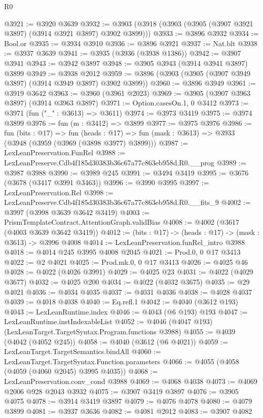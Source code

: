 \begin{lexlean}{R0}
\begin{coremodule}
@3921 := @3920 @3639
@3932 := @3903 (@3918 (@3903 (@3905 (@3907 @3921 @3897) (@3914 @3921 @3897) @3902 @3899)))
@3933 := @3896 @3932
@3934 := Bool.or
@3935 := @3934 @3910
@3936 := @3896 @3921
@3937 := Nat.blt
@3938 := @3937 @3639
@3941 := @3935 (@3936 (@3938 @1386))
@3942 := @3907 @3941
@3943 := @3942 @3897
@3948 := @3905 @3943 (@3914 @3941 @3897) @3899
@3949 := @3938 @2012
@3959 := @3896 (@3903 (@3905 (@3907 @3949 @3897) (@3914 @3949 @3897) @3902 @3899))
@3960 := @3896 @3949
@3961 := @3919 @3642
@3963 := @3960 (@3961 @2023)
@3969 := @3905 (@3907 @3963 @3897) (@3914 @3963 @3897)
@3971 := Option.casesOn.{1, 0} @3412
@3973 := @3971 (fun ("_" : @3613) => @3611)
@3974 := @3973 @3419
@3975 := @3974 @3899
@3976 := fun (m : @3412) => @3899
@3977 := @3975 @3976
@3986 := fun (bits : @17) =>
  fun (heads : @17) => fun (mask : @3613) => @3933 (@3948 (@3959 (@3969 (@3898 @3977) @3899)))
@3987 := LexLeanPreservation.FunRel
@3988 := LexLeanPreserve.Cdb4f185d30383b36c67a77c863eb958d.R0.__prog
@3989 := @3987 @3988
@3990 := @3989 @245
@3991 := @3494 @3419
@3995 := @3676 (@3678 (@3417 @3991 @3463))
@3996 := @3990 @3995
@3997 := LexLeanPreservation.Rel
@3998 := LexLeanPreserve.Cdb4f185d30383b36c67a77c863eb958d.R0.__fits_9
@4002 := @3997 (@3998 @3639 @3642 @3419)
@4003 := PrismTemplateContract.AttentionGraph.validBias
@4008 := @4002 (@3617 (@4003 @3639 @3642 @3419))
@4012 := (bits : @17) -> (heads : @17) -> (mask : @3613) -> @3996 @4008
@4014 := LexLeanPreservation.funRel_intro @3988
@4018 := @4014 @245 @3995 @4008 @2045
@4021 := Prod.{0, 0} @17 @3413
@4022 := @2 @4021
@4025 := Prod.mk.{0, 0} @17 @3413
@4026 := @4025 @46
@4028 := @4022 (@4026 @3991)
@4029 := @4025 @23
@4031 := @4022 (@4029 @3677)
@4032 := @4025 @200
@4034 := @4022 (@4032 @3675)
@4035 := @29 @4021
@4036 := @4034 @4035
@4037 := @4031 @4036
@4038 := @4028 @4037
@4039 := @4018 @4038
@4040 := Eq.refl.{1}
@4042 := @4040 (@3612 @193)
@4043 := LexLeanRuntime.index
@4046 := @4043 (@6 @193) @193
@4047 := LexLeanRuntime.instIndexableList
@4052 := @4046 (@4047 @193) (LexLeanTarget.TargetSyntax.Program.functions @3988)
@4055 := @4039 (@4042 (@4052 @245))
@4058 := @4040 (@3612 (@6 @4021))
@4059 := LexLeanTarget.TargetSemantics.bindAll
@4060 := LexLeanTarget.TargetSyntax.Function.parameters
@4066 := @4055 (@4058 (@4059 (@4060 @2045) @3995 @4035))
@4068 := LexLeanPreservation.conv_cond @3988
@4069 := @4068 @4038
@4073 := @4069 @2006 @928 @2043 @3932
@4075 := @3907 @3419 @3897
@4076 := @3905 @4075
@4078 := @3914 @3419 @3897
@4079 := @4076 @4078
@4080 := @4079 @3899
@4081 := @3937 @3636
@4082 := @4081 @2012
@4083 := @3907 @4082

\end{coremodule}
\end{lexlean}
